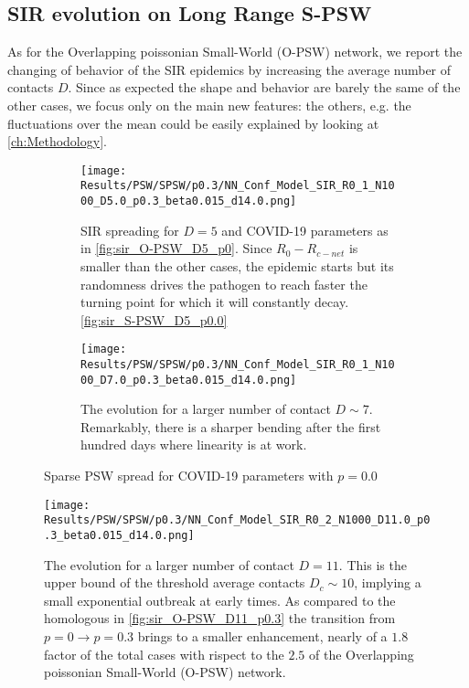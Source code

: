 \documentclass[a4paper,10pt,twoside]{book} %
\theoremstyle{definition}
\begin{document}
\clearpage
\subsection*{SIR evolution on Long Range S-PSW}
As for the Overlapping poissonian Small-World (O-PSW) network, we report the changing of behavior of the SIR epidemics by increasing the average number of contacts $D$. Since as expected the shape and behavior are barely the same of the other cases, we focus only on the main new features: the others, e.g. the fluctuations over the mean could be easily explained by looking at \autoref{ch:Methodology}.

\begin{figure}[ht]
	\centering
	\begin{subfigure}{\linewidth}
		\centering
		\texttt{[image: Results/PSW/SPSW/p0.3/NN\_Conf\_Model\_SIR\_R0\_1\_N1000\_D5.0\_p0.3\_beta0.015\_d14.0.png]}
		\caption{SIR spreading for $D = 5$ and COVID-19 parameters as in \autoref{fig:sir_O-PSW_D5_p0}. Since $R_0 - R_{c-net}$ is smaller than the other cases, the epidemic starts but its randomness drives the pathogen to reach faster the turning point for which it will constantly decay. \autoref{fig:sir_S-PSW_D5_p0.0}}
		\label{fig:sir_SPSW_COVID_D5_p0.3}
	\end{subfigure}
	\vfill	
	\begin{subfigure}{\linewidth}
		\centering
		\texttt{[image: Results/PSW/SPSW/p0.3/NN\_Conf\_Model\_SIR\_R0\_1\_N1000\_D7.0\_p0.3\_beta0.015\_d14.0.png]}
		\caption{The evolution for a larger number of contact $D \sim 7$. Remarkably, there is a sharper bending after the first hundred days where linearity is at work.}
		\label{fig:sir_SPSW_COVID_D7_p0.3}
	\end{subfigure}
	\caption{Sparse PSW spread for COVID-19 parameters with $p = 0.0$ }
	\label{fig:sir_SPSW_COVID_p0.3}
\end{figure}

\clearpage
\begin{figure}[h]
	\centering
	\texttt{[image: Results/PSW/SPSW/p0.3/NN\_Conf\_Model\_SIR\_R0\_2\_N1000\_D11.0\_p0.3\_beta0.015\_d14.0.png]}
	\caption{The evolution for a larger number of contact $D = 11$. This is the upper bound of the threshold average contacts $ D_c \sim 10$, implying a small exponential outbreak at early times. As compared to the homologous in \autoref{fig:sir_O-PSW_D11_p0.3} the transition from $ p = 0 \rightarrow p = 0.3$ brings to a smaller enhancement, nearly of a $1.8$ factor of the total cases with rispect to the $ 2.5$ of the Overlapping poissonian Small-World (O-PSW) network.}
	\label{fig:sir_SPSW_COVID_D11_p0.3}
\end{figure}
\end{document}
